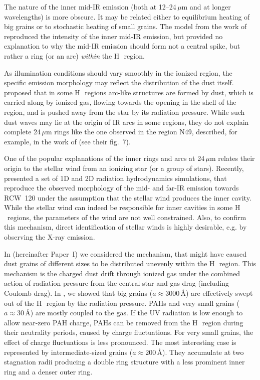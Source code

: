 \documentclass[a4paper,fleqn,usenatbib]{mnras}
\newcommand{\hii}    {H\,{\sc{ii}}~}
\begin{document}
The nature of the inner mid-IR emission (both at 12--24\,$\mu$m and at longer wavelengths) is more obscure. It may be related either to equilibrium heating of big grains or to stochastic heating of small grains. The model from the work of \cite{PavlyuchenkovAR} reproduced the intensity of the inner mid-IR emission, but provided no explanation to why the mid-IR emission should form not a central spike, but rather a ring (or an arc) {\em within\/} the \hii region.

As illumination conditions should vary smoothly in the ionized region, the specific emission morphology may reflect the distribution of the dust itself. \cite{dustwave} proposed that in some \hii regions arc-like structures are formed by dust, which is carried along by ionized gas, flowing towards the opening in the shell of the region, and is pushed away from the star by its radiation pressure. While such dust waves may lie at the origin of IR arcs in some regions, they do not explain complete 24\,$\mu$m rings like the one observed in the region N49, described, for example, in the work of \cite{watson_08} (see their fig.~7).

One of the popular explanations of the inner rings and arcs at 24\,$\mu$m relates their origin to the stellar wind from  an ionizing star (or a group of stars). Recently, \cite{Mackey_16} presented a set of 1D and 2D radiation hydrodynamics simulations, that reproduce the observed morphology of the mid- and far-IR emission towards RCW~120 under the assumption that the stellar wind produces the inner cavity. While the stellar wind can indeed be responsible for inner cavities in some \hii regions, the parameters of the wind are not well constrained. Also, to confirm this mechanism, direct identification of stellar winds is highly desirable, e.g. by observing the X-ray emission.

In \cite{paper_mnrasi} (hereinafter Paper~I) we considered the mechanism, that might have caused dust grains of different sizes to be distributed unevenly within the \hii region. This mechanism is the charged dust drift through ionized gas under the combined action of radiation pressure from the central star and gas drag (including Coulomb drag). In , we showed that big grains ($a\approx3000$\,\AA) are effectively swept out of the \hii region by the radiation pressure. PAHs and very small grains ($a\approx30$\,\AA) are mostly coupled to the gas. If the UV radiation is low enough to allow near-zero PAH charge, PAHs can be removed from the \hii region during their neutrality periods, caused by charge fluctuations. For very small grains, the effect of charge fluctuations is less pronounced. The most interesting case is represented by intermediate-sized grains ($a\approx200$\,\AA). They accumulate at two stagnation radii producing a double ring structure with a less prominent inner ring and a denser outer ring.
\end{document}
